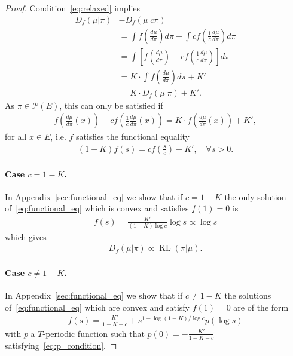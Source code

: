 \documentclass{article}
\newcommand{\KL}{\mathop{\mathrm{KL}}\nolimits}
\newcommand{\cP}{\mathcal P}
\newcommand{\X}{E}
\begin{document}
\begin{proof}


Condition~\eqref{eq:relaxed} implies
\begin{align*}
D_f(\mu | \pi) &- D_f(\mu | c\pi)\\
&= \int f\left(\frac{d\mu}{d\pi}\right)d\pi
- \int c f\left(\frac{1}{c}\frac{d\mu}{d\pi}\right) d\pi \\
&= \int \left[
f\left(\frac{d\mu}{d\pi}\right)
- c f\left(\frac{1}{c}\frac{d\mu}{d\pi}\right)
\right] d\pi\\
&= K\cdot \int f\left(\frac{d\mu}{d\pi}\right)d\pi +K'\\
&=K \cdot D_f(\mu |\pi) + K'.
\end{align*}
As $\pi\in\cP(\X)$, this can only be satisfied if
\begin{align*}
    f\left(\frac{d\mu}{d\pi}(x)\right)-c f\left(\frac{1}{c}\frac{d\mu}{d\pi}(x)\right) = K\cdot f\left(\frac{d\mu}{d\pi}(x)\right)+K',
\end{align*}
for all $x\in \X$, i.e. $f$ satisfies the functional equality
\begin{align}
\label{eq:functional_eq}
    (1-K)f(s) 
= c f\!\left(\frac{s}{c}\right)+K', \quad \forall s>0.
\end{align}

\paragraph*{Case $c=1-K$.}
In Appendix~\ref{sec:functional_eq} we show that if $c=1-K$ the only solution of~\eqref{eq:functional_eq} which is convex and satisfies $f(1)=0$ is
\begin{align*}
    f(s)=\frac{K'}{(1-K) \log c}\log s \propto \log s
\end{align*}
which gives
\begin{align*}
    D_f(\mu|\pi) \propto \KL(\pi|\mu).
\end{align*}

\paragraph*{Case $c\neq 1-K$.}
In Appendix~\ref{sec:functional_eq} we show that if $c\neq 1-K$ the solutions of~\eqref{eq:functional_eq} which are convex and satisfy $f(1)=0$ are of the form 
\begin{align*}
    f(s)= \frac{K'}{1-K-c} + s^{1-\log (1-K)/\log c} p(\log s)
\end{align*}
with $p$ a $T$-periodic function such that $p(0) = -\frac{K'}{1-K-c}$ satisfying~\eqref{eq:p_condition}.


\end{proof}
\end{document}
